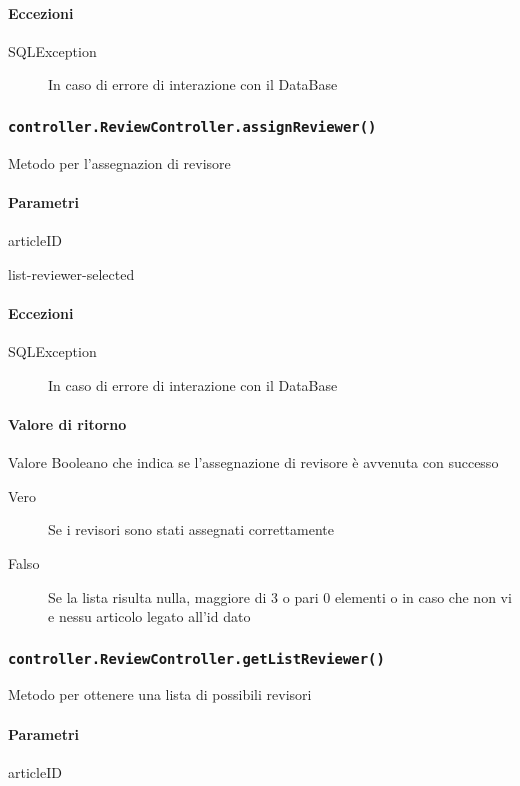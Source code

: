 \paragraph{Eccezioni}
\begin{description}
\item[SQLException] In caso di errore di interazione con il DataBase
\end{description}


\subsubsection{\texttt{controller.ReviewController.assignReviewer()}}
Metodo per l'assegnazion di revisore
\paragraph{Parametri}
\begin{description}
\item articleID
\item list-reviewer-selected
\end{description}
\paragraph{Eccezioni}
\begin{description}
\item[SQLException] In caso di errore di interazione con il DataBase
\end{description}
\paragraph{Valore di ritorno}
Valore Booleano che indica se l'assegnazione di revisore è avvenuta con successo
\begin{description}
\item[Vero] Se i revisori sono stati assegnati correttamente 
\item[Falso] Se la lista risulta nulla, maggiore di 3 o pari 0 elementi o in caso che non vi e nessu articolo legato all'id dato
\end{description}



\subsubsection{\texttt{controller.ReviewController.getListReviewer()}}
Metodo per ottenere una lista di possibili revisori
\paragraph{Parametri}
\begin{description}
\item articleID
\end{description}
